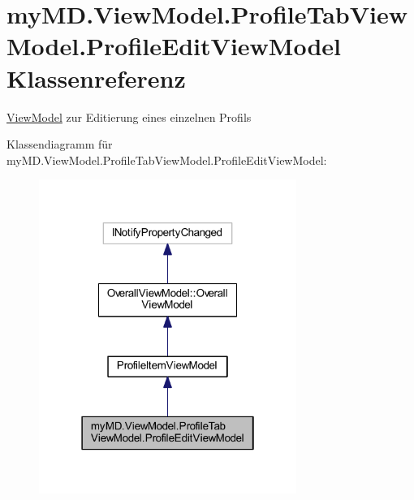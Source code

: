 \hypertarget{classmy_m_d_1_1_view_model_1_1_profile_tab_view_model_1_1_profile_edit_view_model}{}\section{my\+M\+D.\+View\+Model.\+Profile\+Tab\+View\+Model.\+Profile\+Edit\+View\+Model Klassenreferenz}
\label{classmy_m_d_1_1_view_model_1_1_profile_tab_view_model_1_1_profile_edit_view_model}


\mbox{\hyperlink{namespacemy_m_d_1_1_view_model}{View\+Model}} zur Editierung eines einzelnen Profils  




Klassendiagramm für my\+M\+D.\+View\+Model.\+Profile\+Tab\+View\+Model.\+Profile\+Edit\+View\+Model\+:
\nopagebreak
\begin{figure}[H]
\begin{center}
\leavevmode
\includegraphics[width=238pt]{classmy_m_d_1_1_view_model_1_1_profile_tab_view_model_1_1_profile_edit_view_model__inherit__graph}
\end{center}
\end{figure}


